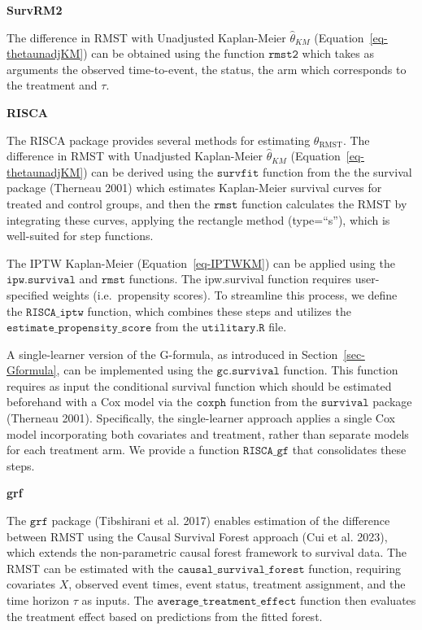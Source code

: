 \documentclass[
  11pt,
  a4paper,
]{article}
\theoremstyle{plain}
\theoremstyle{plain}
\theoremstyle{plain}
\theoremstyle{definition}
\theoremstyle{remark}
\begin{document}
\textbf{SurvRM2}

The difference in RMST with Unadjusted Kaplan-Meier \(\hat \theta_{KM}\)
(Equation~\ref{eq-thetaunadjKM}) can be obtained using the function
\(\texttt{rmst2}\) which takes as arguments the observed time-to-event,
the status, the arm which corresponds to the treatment and \(\tau\).

\textbf{RISCA}

The RISCA package provides several methods for estimating
\(\theta_{\mathrm{RMST}}\). The difference in RMST with Unadjusted
Kaplan-Meier \(\hat \theta_{KM}\) (Equation~\ref{eq-thetaunadjKM}) can
be derived using the \(\texttt{survfit}\) function from the the survival
package (Therneau 2001) which estimates Kaplan-Meier survival curves for
treated and control groups, and then the \(\texttt{rmst}\) function
calculates the RMST by integrating these curves, applying the rectangle
method (type=``s''), which is well-suited for step functions.

The IPTW Kaplan-Meier (Equation~\ref{eq-IPTWKM}) can be applied using
the \(\texttt{ipw.survival}\) and \(\texttt{rmst}\) functions. The
ipw.survival function requires user-specified weights (i.e.~propensity
scores). To streamline this process, we define the
\(\texttt{RISCA\_iptw}\) function, which combines these steps and
utilizes the \(\texttt{estimate\_propensity\_score}\) from the
\(\texttt{utilitary.R}\) file.

A single-learner version of the G-formula, as introduced in
Section~\ref{sec-Gformula}, can be implemented using the
\(\texttt{gc.survival}\) function. This function requires as input the
conditional survival function which should be estimated beforehand with
a Cox model via the \(\texttt{coxph}\) function from the
\(\texttt{survival}\) package (Therneau 2001). Specifically, the
single-learner approach applies a single Cox model incorporating both
covariates and treatment, rather than separate models for each treatment
arm. We provide a function \(\texttt{RISCA\_gf}\) that consolidates
these steps.

\textbf{grf}

The \(\texttt{grf}\) package (Tibshirani et al. 2017) enables estimation
of the difference between RMST using the Causal Survival Forest approach
(Cui et al. 2023), which extends the non-parametric causal forest
framework to survival data. The RMST can be estimated with the
\(\texttt{causal\_survival\_forest}\) function, requiring covariates
\(X\), observed event times, event status, treatment assignment, and the
time horizon \(\tau\) as inputs. The
\(\texttt{average\_treatment\_effect}\) function then evaluates the
treatment effect based on predictions from the fitted forest.
\end{document}
